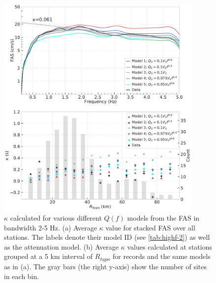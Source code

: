 \begin{figure}[!ht]
  \centering
  \includegraphics[width=0.9\textwidth,height=0.9\textheight,keepaspectratio]{figures/figure_highf_14.pdf}
  \caption{$\kappa$ calculated for various different $Q(f)$ models from the FAS in bandwidth 2-5 Hz. (a) Average $\kappa$ value for stacked FAS over all stations. The labels denote their model ID (see \cref{tab:highf-2}) as well as the attenuation model. (b) Average $\kappa$ values calculated at stations grouped at a 5 km interval of $R_{hypo}$ for records and the same models as in (a). The gray bars (the right y-axis) show the number of sites in each bin.
  }
  \label{fig:highf-14}
\end{figure}
\clearpage



